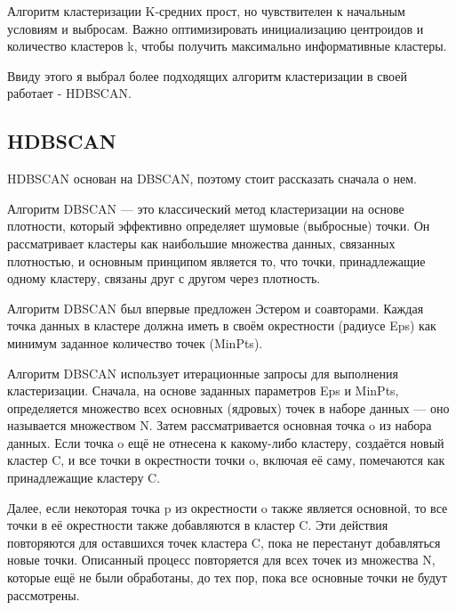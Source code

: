 Алгоритм кластеризации K-средних прост, но чувствителен к начальным условиям и выбросам. Важно оптимизировать инициализацию центроидов и количество кластеров k, чтобы получить максимально информативные кластеры. 

Ввиду этого я выбрал более подходящих алгоритм кластеризации в своей работает - HDBSCAN.

\subsection{HDBSCAN}
HDBSCAN основан на DBSCAN, поэтому стоит рассказать сначала о нем.

Алгоритм DBSCAN — это классический метод кластеризации на основе плотности, который эффективно определяет шумовые (выбросные) точки. Он рассматривает кластеры как наибольшие множества данных, связанных плотностью, и основным принципом является то, что точки, принадлежащие одному кластеру, связаны друг с другом через плотность.

Алгоритм DBSCAN был впервые предложен Эстером и соавторами. Каждая точка данных в кластере должна иметь в своём окрестности (радиусе Eps) как минимум заданное количество точек (MinPts). 

Алгоритм DBSCAN использует итерационные запросы для выполнения кластеризации. Сначала, на основе заданных параметров Eps и MinPts, определяется множество всех основных (ядровых) точек в наборе данных — оно называется множеством N. Затем рассматривается основная точка o из набора данных. Если точка o ещё не отнесена к какому-либо кластеру, создаётся новый кластер C, и все точки в окрестности точки o, включая её саму, помечаются как принадлежащие кластеру C.

Далее, если некоторая точка p из окрестности o также является основной, то все точки в её окрестности также добавляются в кластер C. Эти действия повторяются для оставшихся точек кластера C, пока не перестанут добавляться новые точки. Описанный процесс повторяется для всех точек из множества N, которые ещё не были обработаны, до тех пор, пока все основные точки не будут рассмотрены.

